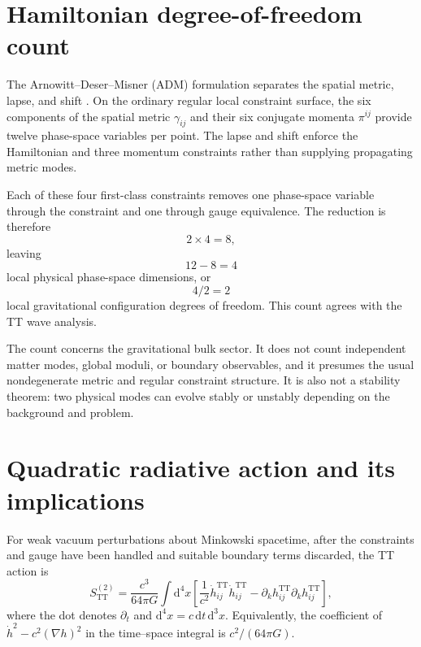 \documentclass[11pt,oneside]{report}
\newcommand{\TT}{\mathrm{TT}}
\newcommand{\dd}{\mathrm d}
\theoremstyle{remark}
\numberwithin{definition}{chapter}
\numberwithin{proposition}{chapter}
\numberwithin{remark}{chapter}
\begin{document}
\section{Hamiltonian degree-of-freedom count}
The Arnowitt--Deser--Misner (ADM) formulation separates the spatial metric, lapse, and shift \parencite{ADM1962}. On the ordinary regular local constraint surface, the six components of the spatial metric $\gamma_{ij}$ and their six conjugate momenta $\pi^{ij}$ provide twelve phase-space variables per point. The lapse and shift enforce the Hamiltonian and three momentum constraints rather than supplying propagating metric modes.

Each of these four first-class constraints removes one phase-space variable through the constraint and one through gauge equivalence. The reduction is therefore
\begin{equation}
2\times4=8,
\label{consistency:eq:firstclassremoval}
\end{equation}
leaving
\begin{equation}
12-8=4
\label{consistency:eq:phasespacecount}
\end{equation}
local physical phase-space dimensions, or
\begin{equation}
4/2=2
\label{consistency:eq:configcount}
\end{equation}
local gravitational configuration degrees of freedom. This count agrees with the TT wave analysis.

The count concerns the gravitational bulk sector. It does not count independent matter modes, global moduli, or boundary observables, and it presumes the usual nondegenerate metric and regular constraint structure. It is also not a stability theorem: two physical modes can evolve stably or unstably depending on the background and problem.

\section{Quadratic radiative action and its implications}
For weak vacuum perturbations about Minkowski spacetime, after the constraints and gauge have been handled and suitable boundary terms discarded, the TT action is
\begin{equation}
S_{\TT}^{(2)}=\frac{c^3}{64\pi G}\int\dd^4x\left[
\frac{1}{c^2}\dot h^{\TT}_{ij}\dot h^{\TT}_{ij}
-\partial_kh^{\TT}_{ij}\partial_kh^{\TT}_{ij}\right],
\label{consistency:eq:ttaction}
\end{equation}
where the dot denotes $\partial_t$ and $\dd^4x=c\,\dd t\,\dd^3x$. Equivalently, the coefficient of $\dot h^2-c^2(\nabla h)^2$ in the time--space integral is $c^2/(64\pi G)$.
\end{document}
